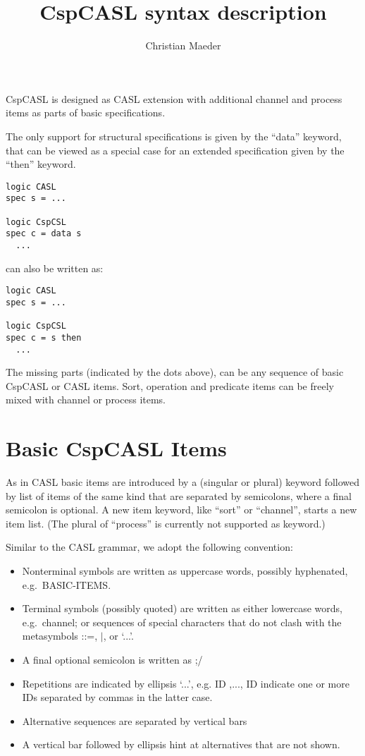 \documentclass{article}
\title{CspCASL syntax description}
\author{Christian Maeder}
\begin{document}
\maketitle

CspCASL is designed as CASL extension with additional channel and process
items as parts of basic specifications.

The only support for structural specifications is given by the ``data''
keyword, that can be viewed as a special case for an extended specification
given by the ``then'' keyword.

\begin{verbatim}
logic CASL
spec s = ...

logic CspCSL
spec c = data s
  ...
\end{verbatim}

can also be written as:

\begin{verbatim}
logic CASL
spec s = ...

logic CspCSL
spec c = s then
  ...
\end{verbatim}

The missing parts (indicated by the dots above), can be any sequence of basic
CspCASL or CASL items. Sort, operation and predicate items can be freely mixed
with channel or process items.

\section{Basic CspCASL Items}

As in CASL basic items are introduced by a (singular or plural) keyword
followed by list of items of the same kind that are separated by semicolons,
where a final semicolon is optional. A new item keyword, like ``sort'' or
``channel'', starts a new item list. (The plural of ``process'' is currently
not supported as keyword.)

Similar to the CASL grammar, we adopt the following convention:
\begin{itemize}
\item Nonterminal symbols are written as uppercase words, possibly hyphenated,
e.g.~BASIC-ITEMS.
\item Terminal symbols (possibly quoted) are written as either lowercase
  words, e.g.~channel; or sequences of special characters that do not clash
  with the metasymbols ::=, $|$, or ‘...’.
\item A final optional semicolon is written as ;/
\item Repetitions are indicated by ellipsis ‘...’, e.g. ID ,..., ID indicate
  one or more IDs separated by commas in the latter case.
\item Alternative sequences are separated by vertical bars
\item A vertical bar followed by ellipsis hint at alternatives that
  are not shown.
\end{itemize}
\end{document}
